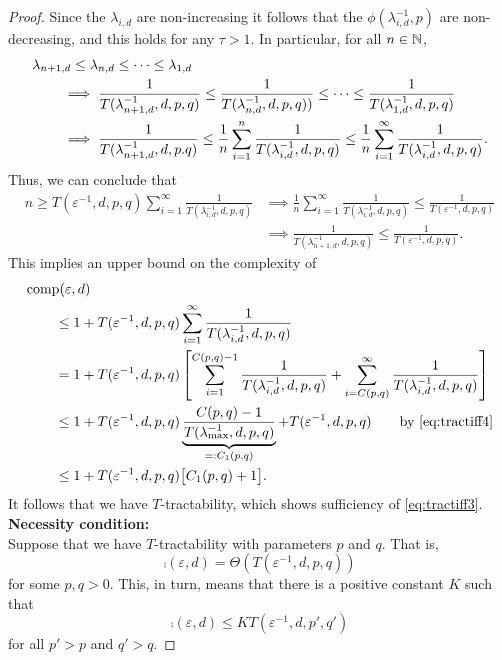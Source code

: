 \documentclass[11pt,a4paper]{article}
\begin{document}
{\begin{proof}
Since the $\lambda_{i,d}$ are non-increasing it follows that the $\phi(\lambda_{i, d}^{-1},p)$ are non-decreasing, and this holds for any $\tau>1$.  
In particular, for all $n \in \mathbb{N}$,
\begin{align*}
    \MoveEqLeft{\lambda_{n+1,d} \le \lambda_{n,d} \le \cdots \le \lambda_{1,d}} \\
    & \implies \frac{1}{T(\lambda_{n+1, d}^{-1},d,p,q)} \le \frac{1}{T(\lambda_{n, d}^{-1},d,p,q))} \le \cdots \le \frac{1}{T(\lambda_{1, d}^{-1},d,p,q)} \\
    & \implies \frac{1}{T(\lambda_{n+1, d}^{-1},d,p.q)} 
    \le \frac 1n \sum_{i=1}^n  \frac{1}{T(\lambda_{i, d}^{-1},d,p,q)} 
    \le \frac 1n \sum_{i=1}^\infty  \frac{1}{T(\lambda_{i, d}^{-1},d,p,q)}.
\end{align*}
Thus, we can conclude that 
\begin{align*}
    n \ge T(\varepsilon^{-1},d,p,q) \sum_{i=1}^\infty \frac{1}{T(\lambda_{i, d}^{-1},d,p,q)}
    & \implies 
  \frac 1n \sum_{i=1}^\infty \frac{1}{T(\lambda_{i, d}^{-1},d,p,q)} \le  \frac{1}{T(\varepsilon^{-1},d,p,q)} \\
   & \implies   \frac{1}{T(\lambda_{n+1, d}^{-1},d,p,q)} \le \frac{1}{T(\varepsilon^{-1},d,p,q)}.
\end{align*}
This implies an upper bound on the complexity of
\begin{align*}
       \MoveEqLeft{\comp(\varepsilon,d)} \\
       &\le 1 + T(\varepsilon^{-1},d,p,q) \sum_{i=1}^\infty \frac{1}{T(\lambda_{i, d}^{-1},d,p,q)} \\       
       & = 1 + T(\varepsilon^{-1},d,p,q) \left [ \sum_{i=1}^{C(p,q)-1} \frac{1}{T(\lambda_{i, d}^{-1},d,p,q)}  
       + \sum_{i=C(p,q)}^\infty \frac{1}{T(\lambda_{i, d}^{-1},d,p,q)} \right ] \\
       & \le 1+ T(\varepsilon^{-1},d,p,q) \underbrace{\frac{C(p,q)-1}{T(\lambda_{\max}^{-1},d,p,q)}}_{=:C_1(p,q)}
       +  T(\varepsilon^{-1},d,p,q) 
        \qquad \text{by \eqref{eq:tractiff4}} \\
        & \le 1+T(\varepsilon^{-1},d,p,q) \bigl[C_1(p,q) +1\bigr].
\end{align*}
It follows that we have $T$-tractability, which shows sufficiency of \eqref{eq:tractiff3}. \\

\textbf{Necessity condition:}\\
Suppose that we have 
$T$-tractability with parameters $p$ and $q$. That is, 
\[
\comp(\varepsilon,d)=\Theta (T(\varepsilon^{-1},d,p,q))
\]
for some $p,q>0$. This, in turn, means that there is a positive constant $K$ such that
\begin{equation}\label{eq_tract_p'q'4}
\comp(\varepsilon,d)\le K T(\varepsilon^{-1},d,p',q')
\end{equation}
for all $p'>p$ and $q'>q$. 


\end{proof}}
\end{document}
